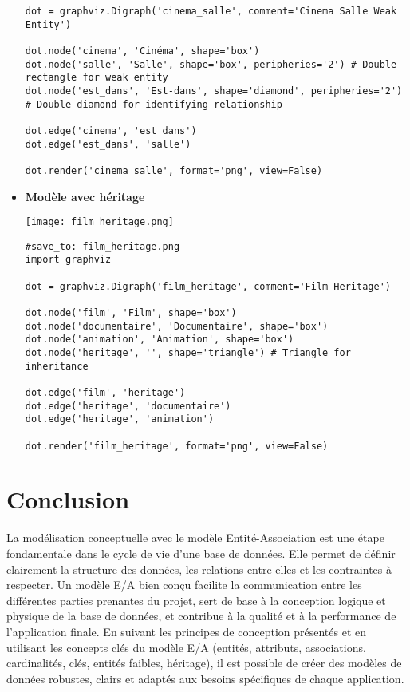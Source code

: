 \documentclass{article}
\begin{document}
\begin{itemize}
\begin{verbatim}
dot = graphviz.Digraph('cinema_salle', comment='Cinema Salle Weak Entity')

dot.node('cinema', 'Cinéma', shape='box')
dot.node('salle', 'Salle', shape='box', peripheries='2') # Double rectangle for weak entity
dot.node('est_dans', 'Est-dans', shape='diamond', peripheries='2') # Double diamond for identifying relationship

dot.edge('cinema', 'est_dans')
dot.edge('est_dans', 'salle')

dot.render('cinema_salle', format='png', view=False)
    \end{verbatim}

    \item \textbf{Modèle avec héritage}
    \begin{center}
        \texttt{[image: film\_heritage.png]}
        \label{fig:film_heritage}
    \end{center}
    \begin{verbatim}
#save_to: film_heritage.png
import graphviz

dot = graphviz.Digraph('film_heritage', comment='Film Heritage')

dot.node('film', 'Film', shape='box')
dot.node('documentaire', 'Documentaire', shape='box')
dot.node('animation', 'Animation', shape='box')
dot.node('heritage', '', shape='triangle') # Triangle for inheritance

dot.edge('film', 'heritage')
dot.edge('heritage', 'documentaire')
dot.edge('heritage', 'animation')

dot.render('film_heritage', format='png', view=False)
    \end{verbatim}
\end{itemize}


\section{Conclusion}

La modélisation conceptuelle avec le modèle Entité-Association est une étape fondamentale dans le cycle de vie d'une base de données.  Elle permet de définir clairement la structure des données, les relations entre elles et les contraintes à respecter.  Un modèle E/A bien conçu facilite la communication entre les différentes parties prenantes du projet, sert de base à la conception logique et physique de la base de données, et contribue à la qualité et à la performance de l'application finale. En suivant les principes de conception présentés et en utilisant les concepts clés du modèle E/A (entités, attributs, associations, cardinalités, clés, entités faibles, héritage), il est possible de créer des modèles de données robustes, clairs et adaptés aux besoins spécifiques de chaque application.
\end{document}
